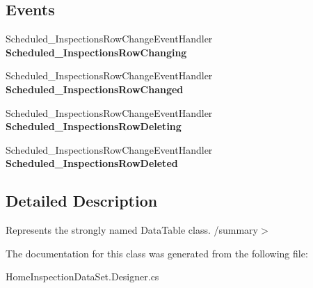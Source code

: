 \subsection*{Events}
\begin{DoxyCompactItemize}
\item 
\mbox{\label{class_a_f_h___scheduler_1_1_home_inspection_data_set_1_1_scheduled___inspections_data_table_a493f72142ec32d9f240e4d8ebcc64019}} 
Scheduled\+\_\+\+Inspections\+Row\+Change\+Event\+Handler {\bfseries Scheduled\+\_\+\+Inspections\+Row\+Changing}
\item 
\mbox{\label{class_a_f_h___scheduler_1_1_home_inspection_data_set_1_1_scheduled___inspections_data_table_ad5640cb99dc22b20fe83712631288205}} 
Scheduled\+\_\+\+Inspections\+Row\+Change\+Event\+Handler {\bfseries Scheduled\+\_\+\+Inspections\+Row\+Changed}
\item 
\mbox{\label{class_a_f_h___scheduler_1_1_home_inspection_data_set_1_1_scheduled___inspections_data_table_a4c6e77b5d4758655bd7f18f9a706057a}} 
Scheduled\+\_\+\+Inspections\+Row\+Change\+Event\+Handler {\bfseries Scheduled\+\_\+\+Inspections\+Row\+Deleting}
\item 
\mbox{\label{class_a_f_h___scheduler_1_1_home_inspection_data_set_1_1_scheduled___inspections_data_table_a2dd58518e157221adbb5e1337e42900a}} 
Scheduled\+\_\+\+Inspections\+Row\+Change\+Event\+Handler {\bfseries Scheduled\+\_\+\+Inspections\+Row\+Deleted}
\end{DoxyCompactItemize}


\subsection{Detailed Description}
Represents the strongly named Data\+Table class. /summary$>$ 

The documentation for this class was generated from the following file\+:\begin{DoxyCompactItemize}
\item 
Home\+Inspection\+Data\+Set.\+Designer.\+cs\end{DoxyCompactItemize}
